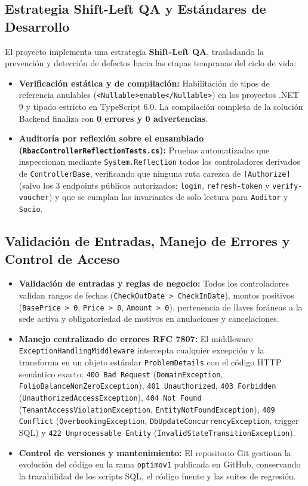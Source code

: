 \documentclass[12pt,a4paper]{article}
\begin{document}
\subsection{Estrategia Shift-Left QA y Est\'andares de Desarrollo}
El proyecto implementa una estrategia \textbf{Shift-Left QA}, trasladando la prevenci\'on y detecci\'on de defectos hacia las etapas tempranas del ciclo de vida:
\begin{itemize}
    \item \textbf{Verificaci\'on est\'atica y de compilaci\'on:} Habilitaci\'on de tipos de referencia anulables (\texttt{<Nullable>enable</Nullable>}) en los proyectos .NET 9 y tipado estricto en TypeScript 6.0. La compilaci\'on completa de la soluci\'on Backend finaliza con \textbf{0 errores y 0 advertencias}.
    \item \textbf{Auditor\'ia por reflexi\'on sobre el ensamblado (\texttt{RbacControllerReflectionTests.cs}):} Pruebas automatizadas que inspeccionan mediante \texttt{System.Reflection} todos los controladores derivados de \texttt{ControllerBase}, verificando que ninguna ruta carezca de \texttt{[Authorize]} (salvo los 3 endpoints p\'ublicos autorizados: \texttt{login}, \texttt{refresh-token} y \texttt{verify-voucher}) y que se cumplan las invariantes de solo lectura para \texttt{Auditor} y \texttt{Socio}.
\end{itemize}

\subsection{Validaci\'on de Entradas, Manejo de Errores y Control de Acceso}
\begin{itemize}
    \item \textbf{Validaci\'on de entradas y reglas de negocio:} Todos los controladores validan rangos de fechas (\texttt{CheckOutDate > CheckInDate}), montos positivos (\texttt{BasePrice > 0}, \texttt{Price > 0}, \texttt{Amount > 0}), pertenencia de llaves for\'aneas a la sede activa y obligatoriedad de motivos en anulaciones y cancelaciones.
    \item \textbf{Manejo centralizado de errores RFC 7807:} El middleware \texttt{ExceptionHandlingMiddleware} intercepta cualquier excepci\'on y la transforma en un objeto est\'andar \texttt{ProblemDetails} con el c\'odigo HTTP sem\'antico exacto: \texttt{400 Bad Request} (\texttt{DomainException}, \texttt{FolioBalanceNonZeroException}), \texttt{401 Unauthorized}, \texttt{403 Forbidden} (\texttt{UnauthorizedAccessException}), \texttt{404 Not Found} (\texttt{TenantAccessViolationException}, \texttt{EntityNotFoundException}), \texttt{409 Conflict} (\texttt{OverbookingException}, \texttt{DbUpdateConcurrencyException}, trigger SQL) y \texttt{422 Unprocessable Entity} (\texttt{InvalidStateTransitionException}).
    \item \textbf{Control de versiones y mantenimiento:} El repositorio Git gestiona la evoluci\'on del c\'odigo en la rama \texttt{optimov1} publicada en GitHub, conservando la trazabilidad de los scripts SQL, el c\'odigo fuente y las suites de regresi\'on.
\end{itemize}
\end{document}
